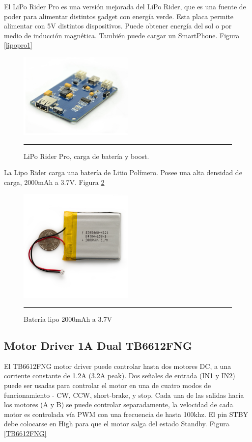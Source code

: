 El LiPo Rider Pro es una versión mejorada del LiPo Rider, que es una fuente de poder para alimentar distintos gadget con energía verde. Esta placa permite alimentar con 5V distintos dispositivos. Puede obtener energía del sol o por medio de inducción magnética. También puede cargar un SmartPhone. Figura \ref{lipopro1}
\newpage

\begin{figure}[htbp]
	\centering
		\includegraphics[width=0.5\textwidth]{./Figures/MODI/lipopro.jpg}
		\rule{35em}{0.5pt}
	\caption[lipopro1]{LiPo Rider Pro, carga de batería y boost.}
	\label{fig:lipopro1}
\end{figure}

La Lipo Rider carga una batería de Litio Polímero. Posee una alta densidad de carga, 2000mAh a 3.7V. Figura \ref{fig:bateria}
\begin{figure}[htbp]
	\centering
		\includegraphics[width=0.5\textwidth]{./Figures/MODI/bateria.jpg}
		\rule{35em}{0.5pt}
	\caption[Bateria]{Batería lipo 2000mAh a 3.7V}
	\label{fig:bateria}
\end{figure}


\subsection{Motor Driver 1A Dual TB6612FNG}
El TB6612FNG motor driver puede controlar hasta dos motores DC, a una corriente constante de 1.2A (3.2A peak). Dos señales de entrada (IN1 y IN2) puede ser usadas para controlar el motor en una de cuatro modos de funcionamiento - CW, CCW, short-brake, y stop. Cada una de las salidas hacia los motores (A y B) se puede controlar separadamente, la velocidad de cada motor es controlada vía PWM con una frecuencia de hasta 100khz. El pin STBY debe colocarse en High para que el motor salga del estado Standby. Figura \ref{TB6612FNG}

